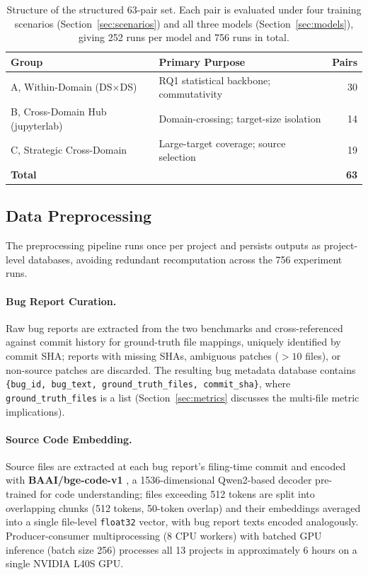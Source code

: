 \documentclass[a4paper,fleqn]{cas-dc}
\begin{document}
\begin{table}[t]
\centering
\caption{Structure of the structured 63-pair set. Each pair is evaluated under
four training scenarios (Section~\ref{sec:scenarios}) and all three models
(Section~\ref{sec:models}), giving 252 runs per model and 756 runs in total.}
\label{tab:pairs}
\small
\begin{tabular}{@{}llr@{}}
\toprule
\textbf{Group} & \textbf{Primary Purpose} & \textbf{Pairs} \\
\midrule
A, Within-Domain (DS$\times$DS)  & RQ1 statistical backbone; commutativity    & 30 \\
B, Cross-Domain Hub (jupyterlab) & Domain-crossing; target-size isolation      & 14 \\
C, Strategic Cross-Domain        & Large-target coverage; source selection     & 19 \\
\midrule
\textbf{Total}                      &                                              & \textbf{63} \\
\bottomrule
\end{tabular}
\end{table}

\subsection{Data Preprocessing}
\label{sec:preprocessing}

The preprocessing pipeline runs once per project and persists outputs as
project-level databases, avoiding redundant recomputation across the 756
experiment runs.

\paragraph{Bug Report Curation.}
Raw bug reports are extracted from the two benchmarks and cross-referenced
against commit history for ground-truth file mappings, uniquely identified
by commit SHA; reports with missing SHAs, ambiguous patches ($>10$ files),
or non-source patches are discarded. The resulting bug metadata database
contains \texttt{\{bug\_id, bug\_text, ground\_truth\_files, commit\_sha\}},
where \texttt{ground\_truth\_files} is a list (Section~\ref{sec:metrics}
discusses the multi-file metric implications).

\paragraph{Source Code Embedding.}
Source files are extracted at each bug report's filing-time commit and
encoded with \textbf{BAAI/bge-code-v1} \citep{bge_code}, a
1536-dimensional Qwen2-based decoder pre-trained for code understanding;
files exceeding 512 tokens are split into overlapping chunks (512 tokens,
50-token overlap) and their embeddings averaged into a single file-level
\texttt{float32} vector, with bug report texts encoded analogously.
Producer-consumer multiprocessing (8 CPU workers) with batched GPU
inference (batch size 256) processes all 13 projects in approximately 6
hours on a single NVIDIA L40S GPU.
\end{document}
